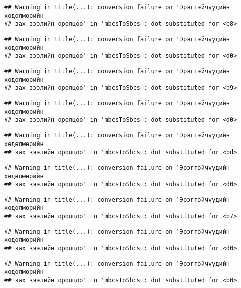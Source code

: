 \documentclass[]{article}
\begin{document}
\begin{verbatim}
## Warning in title(...): conversion failure on 'Эрэгтэйчүүдийн хөдөлмөрийн
## зах зээлийн оролцоо' in 'mbcsToSbcs': dot substituted for <b8>
\end{verbatim}

\begin{verbatim}
## Warning in title(...): conversion failure on 'Эрэгтэйчүүдийн хөдөлмөрийн
## зах зээлийн оролцоо' in 'mbcsToSbcs': dot substituted for <d0>
\end{verbatim}

\begin{verbatim}
## Warning in title(...): conversion failure on 'Эрэгтэйчүүдийн хөдөлмөрийн
## зах зээлийн оролцоо' in 'mbcsToSbcs': dot substituted for <b9>
\end{verbatim}

\begin{verbatim}
## Warning in title(...): conversion failure on 'Эрэгтэйчүүдийн хөдөлмөрийн
## зах зээлийн оролцоо' in 'mbcsToSbcs': dot substituted for <d0>
\end{verbatim}

\begin{verbatim}
## Warning in title(...): conversion failure on 'Эрэгтэйчүүдийн хөдөлмөрийн
## зах зээлийн оролцоо' in 'mbcsToSbcs': dot substituted for <bd>
\end{verbatim}

\begin{verbatim}
## Warning in title(...): conversion failure on 'Эрэгтэйчүүдийн хөдөлмөрийн
## зах зээлийн оролцоо' in 'mbcsToSbcs': dot substituted for <d0>
\end{verbatim}

\begin{verbatim}
## Warning in title(...): conversion failure on 'Эрэгтэйчүүдийн хөдөлмөрийн
## зах зээлийн оролцоо' in 'mbcsToSbcs': dot substituted for <b7>
\end{verbatim}

\begin{verbatim}
## Warning in title(...): conversion failure on 'Эрэгтэйчүүдийн хөдөлмөрийн
## зах зээлийн оролцоо' in 'mbcsToSbcs': dot substituted for <d0>
\end{verbatim}

\begin{verbatim}
## Warning in title(...): conversion failure on 'Эрэгтэйчүүдийн хөдөлмөрийн
## зах зээлийн оролцоо' in 'mbcsToSbcs': dot substituted for <b0>
\end{verbatim}
\end{document}
